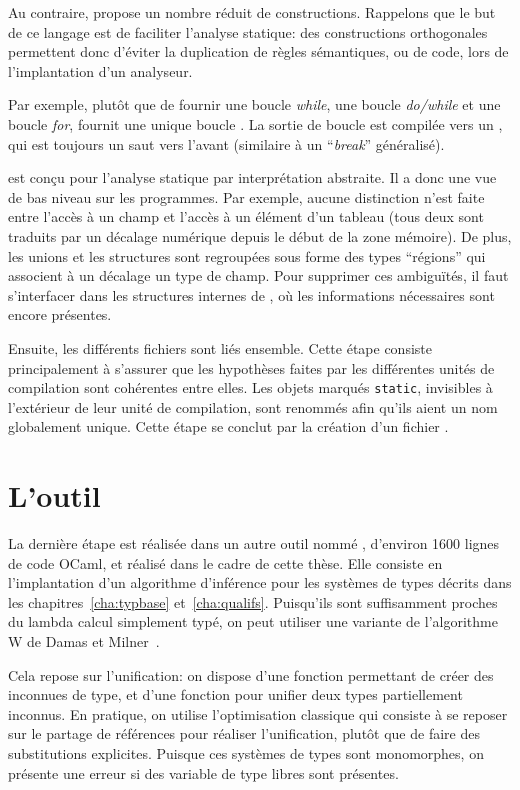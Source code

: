 Au contraire, \newspeak propose un nombre réduit de constructions. Rappelons que
le but de ce langage est de faciliter l'analyse statique: des constructions
orthogonales permettent donc d'éviter la duplication de règles sémantiques, ou
de code, lors de l'implantation d'un analyseur.

Par exemple, plutôt que de fournir une boucle \emph{while}, une boucle
\emph{do/while} et une boucle \emph{for}, \newspeak fournit une unique boucle
\phx\npkWhile. La sortie de boucle est compilée vers un \npkGoto{}\cite{goto},
qui est toujours un saut vers l'avant (similaire à un \enquote{\emph{break}}
généralisé).

\newspeak est conçu pour l'analyse statique par interprétation abstraite. Il a
donc une vue de bas niveau sur les programmes. Par exemple, aucune distinction
n'est faite entre l'accès à un champ et l'accès à un élément d'un tableau (tous
deux sont traduits par un décalage numérique depuis le début de la zone
mémoire). De plus, les unions et les structures sont regroupées sous forme des
types \enquote{régions} qui associent à un décalage un type de champ. Pour
supprimer ces ambiguïtés, il faut s'interfacer dans les structures internes de
\ctonewspeak, où les informations nécessaires sont encore présentes.

Ensuite, les différents fichiers sont liés ensemble. Cette étape consiste
principalement à s'assurer que les hypothèses faites par les différentes unités
de compilation sont cohérentes entre elles. Les objets marqués \texttt{static},
invisibles à l'extérieur de leur unité de compilation, sont renommés afin qu'ils
aient un nom globalement unique. Cette étape se conclut par la création d'un
fichier \newspeak.

\section{L'outil \ptrtype}

La dernière étape est réalisée dans un autre outil nommé \ptrtype, d'environ
1600 lignes de code OCaml, et réalisé dans le cadre de cette thèse. Elle
consiste en l'implantation d'un algorithme d'inférence pour les systèmes de
types décrits dans les chapitres~\ref{cha:typbase} et~\ref{cha:qualifs}.
Puisqu'ils sont suffisamment proches du lambda calcul simplement typé, on peut
utiliser une variante de l'algorithme W de Damas et Milner~\cite{DamasMilner}.


Cela repose sur l'unification: on dispose d'une fonction permettant de créer des
inconnues de type, et d'une fonction pour unifier deux types partiellement
inconnus. En pratique, on utilise l'optimisation classique qui consiste à se
reposer sur le partage de références pour réaliser l'unification, plutôt que de
faire des substitutions explicites. Puisque ces systèmes de types sont
monomorphes, on présente une erreur si des variable de type libres sont
présentes.

